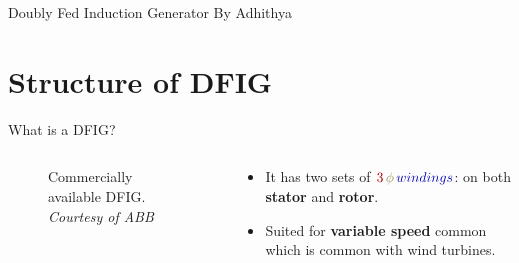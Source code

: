 \documentclass{beamer}
\date{October 3 2023}
\begin{document}
\begin{frame}{Doubly Fed Induction Generator}
\centering By Adhithya
\begin{figure}
    \centering
\end{figure}
\end{frame}

\section{Structure of DFIG}

\begin{frame}{What is a DFIG?}
  \begin{columns}
    \begin{column}{0.6\textwidth} 
    \begin{figure}
        \centering
        \caption{Commercially available DFIG.
        \textit{Courtesy of ABB}}
    \end{figure}
    \end{column}
    
    \begin{column}{0.4\textwidth} %
      \begin{itemize}
        \item It has two sets of $\textcolor{red!70!black}{3} \, \textcolor{yellow!50!black}{\phi} \, \textcolor{blue!70!black}{windings}$: on both \textbf{stator} and \textbf{rotor}.
        
        \item Suited for \textbf{variable speed} common which is common with wind turbines.
      \end{itemize}
    \end{column}
  \end{columns}
\end{frame}
\end{document}

